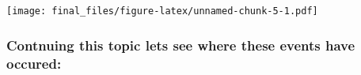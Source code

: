 \documentclass[]{article}
\newenvironment{Shaded}{\begin{snugshade}}{\end{snugshade}}
\newcommand{\KeywordTok}[1]{\textcolor[rgb]{0.13,0.29,0.53}{\textbf{#1}}}
\newcommand{\NormalTok}[1]{#1}
\newcommand{\OperatorTok}[1]{\textcolor[rgb]{0.81,0.36,0.00}{\textbf{#1}}}
\newcommand{\StringTok}[1]{\textcolor[rgb]{0.31,0.60,0.02}{#1}}
\begin{document}
\texttt{[image: final\_files/figure-latex/unnamed-chunk-5-1.pdf]}

\hypertarget{contnuing-this-topic-lets-see-where-these-events-have-occured}{%
\subsubsection{Contnuing this topic lets see where these events have
occured:}\label{contnuing-this-topic-lets-see-where-these-events-have-occured}}

\begin{Shaded}
\begin{Highlighting}[]
\NormalTok{WorldData <-}\StringTok{ }\KeywordTok{map_data}\NormalTok{(}\StringTok{'world'}\NormalTok{)}
\NormalTok{WorldData }\OperatorTok{%>%}\StringTok{ }\KeywordTok{filter}\NormalTok{(region }\OperatorTok{!=}\StringTok{ "Antarctica"}\NormalTok{) ->}\StringTok{ }\NormalTok{WorldData}
\NormalTok{WorldData <-}\StringTok{ }\KeywordTok{fortify}\NormalTok{(WorldData)}

}
\end{Highlighting}
\end{Shaded}
\end{document}

